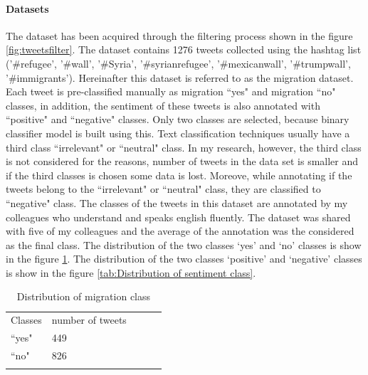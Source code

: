 \paragraph{Datasets}
The dataset has been acquired through the filtering process shown in the figure \ref{fig:tweetsfilter}. The dataset contains 1276 tweets collected using the hashtag list (’\#refugee’, ’\#wall’, ’\#Syria’, ’\#syrianrefugee’, ’\#mexicanwall’, ’\#trumpwall’, ’\#immigrants’). Hereinafter this dataset is referred to as the migration dataset. Each tweet is pre-classified manually as migration ``yes" and migration ``no" classes, in addition, the sentiment of these tweets is also annotated with ``positive" and ``negative" classes. Only two classes are selected, because binary classifier model is built using this. Text classification techniques usually have a third class ``irrelevant" or ``neutral" class. In my research, however, the third class is not considered for the reasons, number of tweets in the data set is smaller and if the third classes is chosen some data is lost. Moreove, while annotating if the tweets belong to the ``irrelevant" or ``neutral" class, they are classified to ``negative" class. The classes of the tweets in this dataset are annotated by my colleagues who understand and speaks english fluently. The dataset was shared with five of my colleagues and the average of the annotation was the considered as the final class. The distribution of the two classes `yes' and `no' classes is show in the figure \ref{tab:DistMigrationClass}. The distribution of the two classes `positive' and `negative' classes is show in the figure \ref{tab:Distribution of sentiment class}.



\begin{table}[]
\centering
\begin{tabular}{lllll}
\cline{1-2}
\multicolumn{1}{|l|}{Classes}   & \multicolumn{1}{l|}{number of tweets} &  &  &  \\ \cline{1-2}
\multicolumn{1}{|l|}{``yes"} & \multicolumn{1}{l|}{449}  &  &  &  \\ \cline{1-2}
\multicolumn{1}{|l|}{``no"}   & \multicolumn{1}{l|}{826}  &  &  &  \\ \cline{1-2}
                            &                           &  &  & 

\end{tabular}
\caption{Distribution of migration class}
\label{tab:DistMigrationClass}
\end{table}

